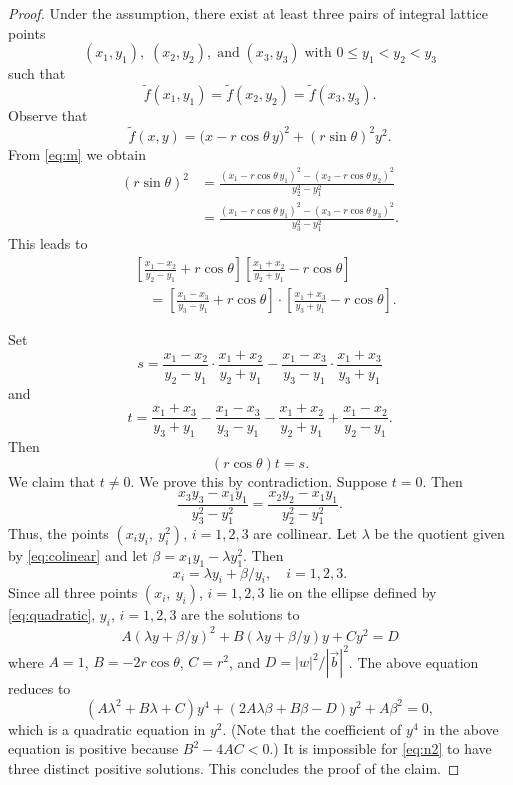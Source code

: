 \documentclass[11pt]{amsart}
\theoremstyle{definition}
\begin{document}
\begin{proof}  Under the assumption, there exist at least three pairs of integral lattice points
\[
(x_1, y_1), \; (x_2, y_2),\; \text{and}\; (x_3, y_3) \; \text{with } 0 \leq y_1 < y_2 < y_3
\]
such that
\begin{equation}\label{eq:m}
\tilde f(x_1, y_1) = \tilde f(x_2, y_2) = \tilde f(x_3, y_3).
\end{equation}
Observe that
\[
\tilde f(x,y) = \bigl( x - r\cos\theta \, y \bigr)^2 + (r\sin\theta)^2 y^2.
\]
From \eqref{eq:m} we obtain
\begin{equation}\label{eq:sin}
	\begin{aligned}
(r\sin\theta)^2 &= \frac{(x_1 - r\cos\theta \, y_1)^2 - (x_2 - r\cos\theta \, y_2)^2}{y_2^2 - y_1^2}\\
&= \frac{(x_1 - r\cos\theta \, y_1)^2 - (x_3 - r\cos\theta \, y_3)^2}{y_3^2 - y_1^2}.
\end{aligned}
\end{equation}
This leads to
\begin{align*}
	&\left[ \frac{x_1 - x_2}{y_2 - y_1} + r \cos \theta \right] \left[ \frac{x_1 + x_2}{y_2 + y_1} - r \cos \theta \right] \\
	&\quad = \left[ \frac{x_1 - x_3}{y_3 - y_1} + r \cos \theta \right] \cdot \left[ \frac{x_1 + x_3}{y_3 + y_1} - r \cos \theta \right].
\end{align*}

Set
\[
s=\frac{x_1 - x_2}{y_2 - y_1} \cdot \frac{x_1 + x_2}{y_2 + y_1}
- \frac{x_1 - x_3}{y_3 - y_1} \cdot \frac{x_1 + x_3}{y_3 + y_1}
\]
and
\[
t=\frac{x_1 + x_3}{y_3 + y_1} - \frac{x_1 - x_3}{y_3 - y_1}
- \frac{x_1 + x_2}{y_2 + y_1} + \frac{x_1 - x_2}{y_2 - y_1}.
\]
Then
\begin{equation}\label{eq:cos}
(r\cos\theta) t=s.
\end{equation}
We claim that $t\not=0$.  We prove this by contradiction. Suppose $t=0$. Then
\begin{equation}\label{eq:colinear}
	\frac{x_3y_3 - x_1y_1}{y_3^2 - y_1^2} = \frac{x_2y_2 - x_1y_1}{y_2^2 - y_1^2}.
\end{equation}
Thus, the points $(x_iy_i,\ y_i^2)$, $i=1, 2, 3$ are collinear. Let $\lambda$ be the quotient given 
by \eqref{eq:colinear} and let $\beta=x_1y_1-\lambda y_1^2$.  Then 
\[
x_i=\lambda y_i+\beta/y_i, \quad i=1, 2, 3.
\]
Since all three points $(x_i,\ y_i)$, $i=1, 2, 3$ lie on the ellipse defined by \eqref{eq:quadratic}, $y_i$, $i=1, 2, 3$ are
the solutions to  
\[
A(\lambda y+\beta/y)^2+B(\lambda y+\beta/y)y+Cy^2=D
\]
where $A=1$, $B=-2r\cos\theta$, $C=r^2$, and $D=|w|^2/|\vec{b}|^2$.  The above equation reduces to
\begin{equation}\label{eq:n2}
(A\lambda^2+B\lambda+C)y^4+(2A\lambda\beta+B\beta-D)y^2+A\beta^2=0,
\end{equation}
which is a quadratic equation in $y^2$. (Note that the coefficient of $y^4$ in the above 
equation is positive because $B^2-4AC<0$.)  It is impossible for \eqref{eq:n2} to have 
three distinct positive solutions.  This concludes the proof of the claim.
  

\end{proof}
\end{document}
